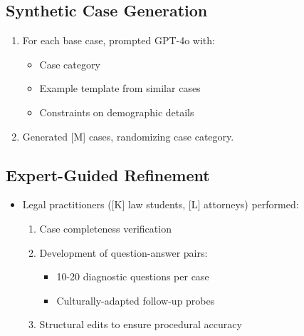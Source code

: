 \subsection{Synthetic Case Generation}
\begin{enumerate}
    \item For each base case, prompted GPT-4o with:
    \begin{itemize}
        \item Case category
        \item Example template from similar cases
        \item Constraints on demographic details
    \end{itemize}
    
    \item Generated [M] cases, randomizing case category.
\end{enumerate}

\subsection{Expert-Guided Refinement}
\begin{itemize}
    \item Legal practitioners ([K] law students, [L] attorneys) performed:
    \begin{enumerate}
        \item Case completeness verification
        \item Development of question-answer pairs:
        \begin{itemize}
            \item 10-20 diagnostic questions per case
            \item Culturally-adapted follow-up probes
        \end{itemize}
        
        \item Structural edits to ensure procedural accuracy
    \end{enumerate}
\end{itemize}

